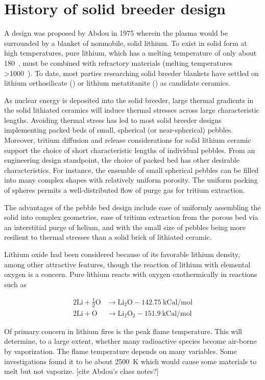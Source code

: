\chapter{History of solid breeder design}\label{sec:solid-breeder-history}
A design was proposed by Abdou\etal\cite{Abdou1975} in 1975 wherein the plasma would be surrounded by a blanket of nonmobile, solid lithium. To exist in solid form at high temperatures, pure lithium, which has a melting temperature of only about 180~\celsius, must be combined with refractory materials (melting temperatures >1000~\celsius). To date, most parties researching solid breeder blankets have settled on lithium orthosilicate (\lis) or lithium metatitanite (\lit) as candidate ceramics.

As nuclear energy is deposited into the solid breeder, large thermal gradients in the solid lithiated ceramics will induce thermal stresses across large characteristic lengths. Avoiding thermal stress has led to most solid breeder designs implementing packed beds of small, spherical (or near-spherical) pebbles.\cite{Lulewicz2002, Mandal2012a, Tsuchiya1998, Cho2012} Moreover, tritium diffusion and release considerations for solid lithium ceramic support the choice of short characteristic lengths of individual pebbles. From an engineering design standpoint, the choice of packed bed has other desirable characteristics. For instance, the ensemble of small spherical pebbles can be filled into many complex shapes with relatively uniform porosity. The uniform packing of spheres permits a well-distributed flow of purge gas for tritium extraction. 

The advantages of the pebble bed design include ease of uniformly assembling the solid into complex geometries, ease of tritium extraction from the porous bed via an interstitial purge of helium, and with the small size of pebbles being more resilient to thermal stresses than a solid brick of lithiated ceramic.\cite{Casadio2004} 


Lithium oxide had been considered because of its favorable lithium density, among other attractive features, though the reaction of lithium with elemental oxygen is a concern. Pure lithium reacts with oxygen exothermically in reactions such as

\begin{subequations}
\begin{align}
	2\mathrm{Li} + \frac{1}{2}\mathrm{O} &\rightarrow \mathrm{Li}_2\mathrm{O} - 142.75\ \text{kCal/mol}\\
	2\mathrm{Li} + \mathrm{O} &\rightarrow \mathrm{Li}_2\mathrm{O}_2 - 151.9\ \text{kCal/mol}
\end{align}
\end{subequations}

Of primary concern in lithium fires is the peak flame temperature. This will determine, to a large extent, whether many radioactive species become air-borne by vaporization. The flame temperature depends on many variables. Some investigations found it to be about 2500~K which would cause some materials to melt but not vaporize. [cite Abdou's class notes?]